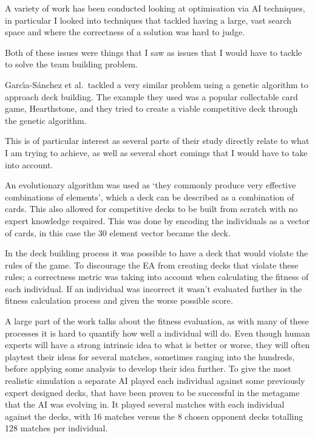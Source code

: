 \documentclass[a4paper]{article}
\begin{document}
A variety of work has been conducted looking at optimisation via AI techniques, in particular I looked into techniques that tackled having a large, vast search space and where the correctness of a solution was hard to judge.

Both of these issues were things that I saw as issues that I would have to tackle to solve the team building problem.
\\ \par
Garc{\'\i}a-S{\'a}nchez et al.\ tackled a very similar problem using a genetic algorithm to approach deck building\cite{hearthstoneAI}.
The example they used was a popular collectable card game, Hearthstone, and they tried to create a viable competitive deck through the genetic algorithm.

This is of particular interest as several parts of their study directly relate to what I am trying to achieve, as well as several short comings that I would have to take into account.
\par
An evolutionary algorithm was used as `they commonly produce very effective combinations of elements', which a deck can be described as a combination of cards.
This also allowed for competitive decks to be built from scratch with no expert knowledge required.
This was done by encoding the individuals as a vector of cards, in this case the 30 element vector became the deck.
\par
In the deck building process it was possible to have a deck that would violate the rules of the game.
To discourage the EA from creating decks that violate these rules; a correctness metric was taking into account when calculating the fitness of each individual.
If an individual was incorrect it wasn't evaluated further in the fitness calculation process and given the worse possible score.
\\ \par
A large part of the work talks about the fitness evaluation, as with many of these processes it is hard to quantify how well a individual will do.
Even though human experts will have a strong intrinsic idea to what is better or worse, they will often playtest their ideas for several matches, sometimes ranging into the hundreds, before applying some analysis to develop their idea further.
To give the most realistic simulation a separate AI played each individual against some previously expert designed decks, that have been proven to be successful in the metagame that the AI was evolving in.
It played several matches with each individual against the decks, with 16 matches versus the 8 chosen opponent decks totalling 128 matches per individual.
\end{document}
